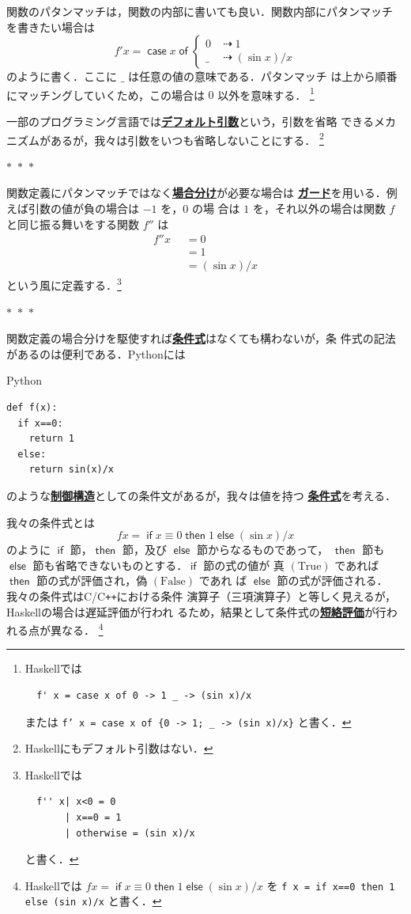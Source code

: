 \documentclass[a5paper,twoside,fleqn,draft]{jsbook}
\newcommand{\separator}{\begin{center}$*$~$*$~$*$\end{center}}
\newcommand{\programminglanguage}[1]{\textsf{#1}}
\newcommand{\clang}{\programminglanguage{C}}
\newcommand{\cxx}{\programminglanguage{C}\texttt{++}}
\newcommand{\haskell}{\programminglanguage{Haskell}}
\newcommand{\python}{\programminglanguage{Python}}
\newcommand{\keyword}[1]{{\underline{\textbf{#1}}}}
\newcommand{\code}[1]{\texttt{#1}}
\newenvironment{pythoncode}{\begin{itembox}[r]{\python}}{\end{itembox}}
\newcommand{\mKeyword}[1]{\mathsf{#1}} %
\newcommand{\mIfKeyword}{\mKeyword{if}}
\newcommand{\mCaseKeyword}{\mKeyword{case}}
\newcommand{\mElseKeyword}{\mKeyword{else}}
\newcommand{\mOfKeyword}{\mKeyword{of}}
\newcommand{\mOtherwiseKeyword}{\mKeyword{otherwise}}
\newcommand{\mThenKeyword}{\mKeyword{then}}
\DeclareMathOperator{\mCaseKW}{\mCaseKeyword} %
\DeclareMathOperator{\mElse}{\mElseKeyword}
\DeclareMathOperator{\mIf}{\mIfKeyword}
\DeclareMathOperator{\mOfKW}{\mOfKeyword} %
\DeclareMathOperator{\mOtherwise}{\mOtherwiseKeyword}
\DeclareMathOperator{\mThen}{\mThenKeyword}
\newcommand{\mSpecialConstant}[1]{\textrm{#1}} %
\newcommand{\mFalse}{\mSpecialConstant{False}}
\newcommand{\mTrue}{\mSpecialConstant{True}}
\newcommand{\mAnyParam}{\_}
\DeclareMathOperator{\mIfSo}{\dashrightarrow}
\newcommand{\mGuard}[1]{\mathop{\mid_{#1}}}
\newcommand{\mCaseOf}[1]{\mCaseKW#1\mOfKW}
\newcommand{\mIfThenElse}[3]{\mIf{#1}\mThen{#2}\mElse{#3}}
\begin{document}
関数のパタンマッチは，関数の内部に書いても良い．関数内部にパタンマッチ
を書きたい場合は
\begin{equation}
  f'x=\mCaseOf{x}\begin{cases}
    0&\mIfSo1\\
    \mAnyParam&\mIfSo(\sin x)/x
  \end{cases}
\end{equation}
のように書く．ここに $\mAnyParam$ は任意の値の意味である．パタンマッチ
は上から順番にマッチングしていくため，この場合は $0$ 以外を意味する．
\footnote{\haskell では
\begin{verbatim}
  f' x = case x of 0 -> 1 _ -> (sin x)/x
\end{verbatim}
または \code{f' x = case x of \{0 -> 1; \_ -> (sin x)/x\}} と書く．}

一部のプログラミング言語では\keyword{デフォルト引数}という，引数を省略
できるメカニズムがあるが，我々は引数をいつも省略しないことにする．
\footnote{\haskell にもデフォルト引数はない．}

\separator

関数定義にパタンマッチではなく\keyword{場合分け}が必要な場合は
\keyword{ガード}を用いる．例えば引数の値が負の場合は $-1$ を，$0$ の場
合は $1$ を，それ以外の場合は関数 $f$ と同じ振る舞いをする関数 $f''$ は
\begin{equation}
  \begin{aligned}
    f''x&\mGuard{x<0}=0\\
    &\mGuard{x\equiv0}=1\\
    &\mGuard{\mOtherwise}=(\sin x)/x
  \end{aligned}
\end{equation}
という風に定義する．\footnote{\haskell では
\begin{verbatim}
  f'' x| x<0 = 0
       | x==0 = 1
       | otherwise = (sin x)/x
\end{verbatim}
と書く．}

\separator

関数定義の場合分けを駆使すれば\keyword{条件式}はなくても構わないが，条
件式の記法があるのは便利である．\python には
\begin{pythoncode}
\begin{verbatim}
def f(x):
  if x==0:
    return 1
  else:
    return sin(x)/x
\end{verbatim}
\end{pythoncode}
のような\keyword{制御構造}としての条件文があるが，我々は値を持つ
\keyword{条件式}を考える．

我々の条件式とは
\begin{equation}
  fx=\mIfThenElse{x\equiv0}{1}{{}(\sin x)/x}
\end{equation}
のように $\mIf$ 節，$\mThen$ 節，及び $\mElse$ 節からなるものであって，
$\mThen$ 節も $\mElse$ 節も省略できないものとする．$\mIf$ 節の式の値が
真 $(\mTrue)$ であれば $\mThen$ 節の式が評価され，偽 $(\mFalse)$ であれ
ば $\mElse$ 節の式が評価される．我々の条件式は\clang/\cxx における条件
演算子（三項演算子）と等しく見えるが，\haskell の場合は遅延評価が行われ
るため，結果として条件式の\keyword{短絡評価}が行われる点が異なる．
\footnote{\haskell では $fx=\mIfThenElse{x\equiv0}{1}{{}(\sin x)/x}$
を \code{f x = if x==0 then 1 else (sin x)/x} と書く．}
\end{document}
